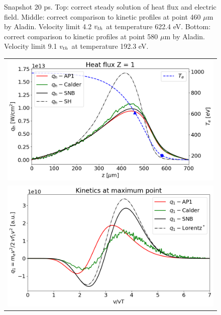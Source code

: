 \begin{figure}[htb]
\begin{center}
\begin{tabular}{c}
    \end{tabular}
  \caption{  
  Snapshot 20 ps. Top: correct steady solution of heat flux and electric field. 
  Middle: correct comparison to kinetic profiles at point 460 $\mu$m by Aladin. 
  Velocity limit 4.2 $v_{th}$ at temperature 622.4 eV.
  Bottom: correct comparison to kinetic profiles at point 580 $\mu$m by Aladin.
  Velocity limit 9.1 $v_{th}$ at temperature 192.3 eV.
  }
  \label{fig:C7_Aladin_case5}
  \end{center} 
\end{figure}

\begin{figure}[htb]
  \begin{center}
    \begin{tabular}{c}
      \includegraphics[width=\figscale\textwidth]{../VFPdata/C7_Calder_case5_heatflux.png} \\
      \includegraphics[width=\figscale\textwidth]{../VFPdata/C7_Calder_case5_kinetics.png} \\

\end{tabular}
\end{center}
\end{figure}

